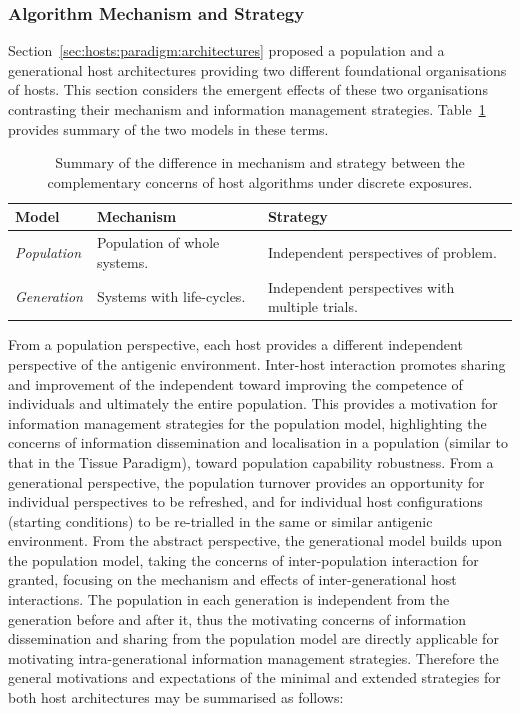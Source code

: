 %
%
\subsubsection{Algorithm Mechanism and Strategy}
Section~\ref{sec:hosts:paradigm:architectures} proposed a population and a generational host architectures providing two different foundational organisations of hosts. This section considers the emergent effects of these two organisations contrasting their mechanism and information management strategies. Table~\ref{tab:hosts:realisation:models:behaviours} provides summary of the two models in these terms.

\begin{table}[ht]
	\centering\small
		\begin{tabular}{lll}
		\toprule
		\textbf{Model} & \textbf{Mechanism} & \textbf{Strategy}  \\ 
		\toprule	
		\emph{Population} & Population of whole systems. & Independent perspectives of problem.\\
		\emph{Generation} & Systems with life-cycles. & Independent perspectives with multiple trials.\\		
		\bottomrule	
		\end{tabular}
	\caption{Summary of the difference in mechanism and strategy between the complementary concerns of host algorithms under discrete exposures.}
	\label{tab:hosts:realisation:models:behaviours}
\end{table}

From a population perspective, each host provides a different independent perspective of the antigenic environment. Inter-host interaction promotes sharing and improvement of the independent toward improving the competence of individuals and ultimately the entire population. This provides a motivation for information management strategies for the population model, highlighting the concerns of information dissemination and localisation in a population (similar to that in the Tissue Paradigm), toward population capability robustness.
From a generational perspective, the population turnover provides an opportunity for individual perspectives to be refreshed, and for individual host configurations (starting conditions) to be re-trialled in the same or similar antigenic environment. From the abstract perspective, the generational model builds upon the population model, taking the concerns of inter-population interaction for granted, focusing on the mechanism and effects of inter-generational host interactions. The population in each generation is independent from the generation before and after it, thus the motivating concerns of information dissemination and sharing from the population model are directly applicable for motivating intra-generational information management strategies.
Therefore the general motivations and expectations of the minimal and extended strategies for both host architectures may be summarised as follows:

